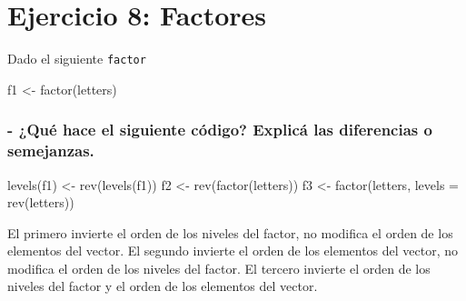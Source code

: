 \documentclass[
]{article}
\newenvironment{Shaded}{\begin{snugshade}}{\end{snugshade}}
\newcommand{\AttributeTok}[1]{\textcolor[rgb]{0.77,0.63,0.00}{#1}}
\newcommand{\FunctionTok}[1]{\textcolor[rgb]{0.00,0.00,0.00}{#1}}
\newcommand{\NormalTok}[1]{#1}
\newcommand{\OtherTok}[1]{\textcolor[rgb]{0.56,0.35,0.01}{#1}}
\begin{document}
\hypertarget{ejercicio-8-factores}{%
\section{Ejercicio 8: Factores}\label{ejercicio-8-factores}}

Dado el siguiente \texttt{factor}

\begin{Shaded}
\begin{Highlighting}[]
\NormalTok{f1 }\OtherTok{\textless{}{-}} \FunctionTok{factor}\NormalTok{(letters)}
\end{Highlighting}
\end{Shaded}

\hypertarget{quuxe9-hace-el-siguiente-cuxf3digo-explicuxe1-las-diferencias-o-semejanzas.}{%
\subsubsection{- ¿Qué hace el siguiente código? Explicá las diferencias
o
semejanzas.}\label{quuxe9-hace-el-siguiente-cuxf3digo-explicuxe1-las-diferencias-o-semejanzas.}}

\begin{Shaded}
\begin{Highlighting}[]
\FunctionTok{levels}\NormalTok{(f1) }\OtherTok{\textless{}{-}} \FunctionTok{rev}\NormalTok{(}\FunctionTok{levels}\NormalTok{(f1))}
\NormalTok{f2 }\OtherTok{\textless{}{-}} \FunctionTok{rev}\NormalTok{(}\FunctionTok{factor}\NormalTok{(letters))}
\NormalTok{f3 }\OtherTok{\textless{}{-}} \FunctionTok{factor}\NormalTok{(letters, }\AttributeTok{levels =} \FunctionTok{rev}\NormalTok{(letters)) }
\end{Highlighting}
\end{Shaded}

El primero invierte el orden de los niveles del factor, no modifica el
orden de los elementos del vector. El segundo invierte el orden de los
elementos del vector, no modifica el orden de los niveles del factor. El
tercero invierte el orden de los niveles del factor y el orden de los
elementos del vector.
\end{document}
